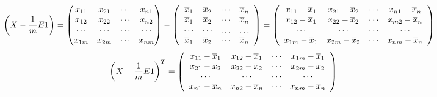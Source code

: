 \documentclass[12pt,a4paper]{article}
\begin{document}
\begin{enumerate}
\begin{enumerate}
{\begin{equation}
\begin{split}
\begin{aligned}
\notag
		\left(X-\frac{1}{m} E 1\right) &= \begin{pmatrix}	
		x_{11}&x_{21}&\cdots&x_{n1}\\ 
		x_{12}&x_{22}&\cdots&x_{n2}\\ 
		\cdots & \cdots & \cdots & \cdots \\
		x_{1m}&x_{2m}&\cdots&x_{nm}
		\end{pmatrix} - \left( \begin{array}{cccc}{\overline{x}_{1}} & {\overline{x}_{2}} & {\cdots} & {\overline{x}_{n}} \\ {\overline{x}_{1}} & {\overline{x}_{2}} & {\cdots} & {\overline{x}_{n}} \\ {\cdots} & {\cdots} & {\ldots} & {\dots} \\ {\overline{x}_{1}} & {\overline{x}_{2}} & {\cdots} & {\overline{x}_{n}}\end{array}\right) 
		=\left( \begin{array}{cccc}{x_{11}-\overline{x}_{1}} & {x_{21}-\overline{x}_{2}} & {\cdots} & {x_{n 1}-\overline{x}_{n}} \\ {x_{12}-\overline{x}_{1}} & {x_{22}-\overline{x}_{2}} & {\cdots} & {x_{m 2}-\overline{x}_{n}} \\ {\cdots} & {\cdots} & {\cdots} & {\cdots} \\ {x_{1 m}-\overline{x}_{1}} & {x_{2 m}-\overline{x}_{2}} & {\cdots} & {x_{n m}-\overline{x}_{n}}\end{array}\right)
\end{aligned}
\end{split}
\end{equation}
\begin{equation}
\begin{split}
\begin{aligned}
\notag
		\left(X-\frac{1}{m} E 1\right)^T = \left( \begin{array}{cccc}{
		x_{11}-\overline{x}_{1}} & {x_{12}-\overline{x}_{1}} & {\cdots} & {x_{1 m}-\overline{x}_{1}} \\ 
		{x_{21}-\overline{x}_{2}} & {x_{22}-\overline{x}_{2}} & {\cdots} & {x_{2 m}-\overline{x}_{2}} \\ 
		{\cdots} & {\cdots} & {\cdots} & {\cdots} \\ 
		{x_{n 1}-\overline{x}_{n}} & {x_{n 2}-\overline{x}_{n}} & {\cdots} & {x_{n m}-\overline{x}_{n}}\end{array}\right)
		\end{aligned}
		\end{split}
		\end{equation}
		

}
\end{enumerate}
\end{enumerate}
\end{document}
